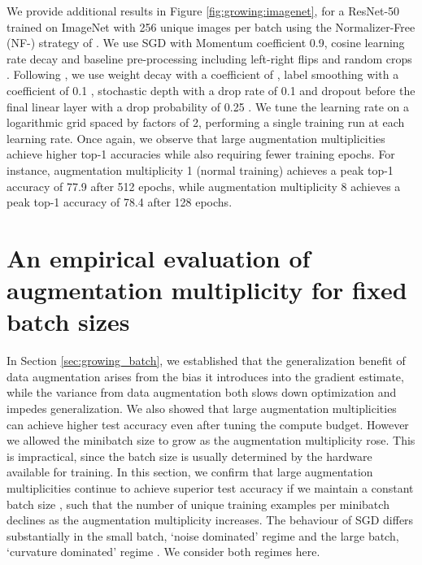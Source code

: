 \documentclass{article}
\begin{document}
We provide additional results in Figure \ref{fig:growing:imagenet}, for a ResNet-50 \citep{he2016identity} trained on ImageNet \citep{ILSVRC15} with 256 unique images per batch using the Normalizer-Free (NF-) strategy of \citet{brock2021characterizing}. We use SGD with Momentum coefficient 0.9,  cosine learning rate decay \citep{loshchilov2016sgdr} and baseline pre-processing including left-right flips and random crops \citep{szegedy2017inception}. 
Following \citet{brock2021characterizing}, we use weight decay with a coefficient of , label smoothing with a coefficient of 0.1 \citep{szegedy2016rethinking}, stochastic depth with a drop rate of 0.1 \citep{huang2016deep} and dropout before the final linear layer with a drop probability of 0.25 \citep{srivastava2014dropout}. 
We tune the learning rate on a logarithmic grid spaced by factors of 2, performing a single training run at each learning rate. Once again, we observe that large augmentation multiplicities achieve higher top-1 accuracies while also requiring fewer training epochs. For instance, augmentation multiplicity 1 (normal training) achieves a peak top-1 accuracy of 77.9 after 512 epochs, while augmentation multiplicity 8 achieves a peak top-1 accuracy of 78.4 after 128 epochs.
 














 

\section{An empirical evaluation of augmentation multiplicity for fixed batch sizes}

\label{sec:fixed}

In Section \ref{sec:growing_batch}, we established that the generalization benefit of data augmentation arises from the bias it introduces into the gradient estimate, while the variance from data augmentation both slows down optimization and impedes generalization. We also showed that large augmentation multiplicities can achieve higher test accuracy even after tuning the compute budget. However we allowed the minibatch size to grow as the augmentation multiplicity rose. This is impractical, since the batch size is usually determined by the hardware available for training. In this section, we confirm that large augmentation multiplicities continue to achieve superior test accuracy if we maintain a constant batch size , such that the number of unique training examples per minibatch declines as the augmentation multiplicity increases. The behaviour of SGD differs substantially in the small batch, `noise dominated' regime and the large batch, `curvature dominated' regime \citep{ma2017power,zhang2019algorithmic, smith2020generalization}. We consider both regimes here.
\end{document}
